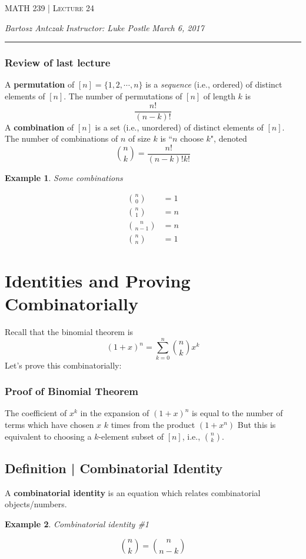 \documentclass{report}
\newcommand{\lectureNum}{24}
\newcommand{\curDate}{March 6, 2017}
\newcommand{\course}{MATH 239}
\newcommand{\instructor}{Luke Postle}
\newtheorem{ex}{Example}[section]
\begin{document}
\begin{center}
\begin{Large}
\textsc{\course{} | Lecture \lectureNum{}}
\end{Large}
\end{center} 
\noindent \textit{Bartosz Antczak} \hfill
\textit{Instructor: \instructor{}} \hfill
\textit{\curDate{}}
\rule{\textwidth}{0.4pt}
\subsubsection{Review of last lecture}
A \textbf{permutation} of $[n] = \{1,2,\cdots, n\}$ is a \textit{sequence} (i.e., ordered) of distinct elements of $[n]$. The number of permutations of $[n]$ of length $k$ is $$\frac{n!}{(n-k)!}$$
A \textbf{combination} of $[n]$ is a set (i.e., unordered) of distinct elements of $[n]$. The number of combinations of $n$ of size $k$ is ``$n$ choose $k$", denoted $${n \choose k} = \frac{n!}{(n-k)!k!}$$
\begin{ex}
Some combinations
\end{ex}
\begin{align*}
n \choose 0 &= 1 \\
n \choose 1 &= n \\
n \choose n-1 &= n \\
n \choose n &= 1
\end{align*}
\section{Identities and Proving Combinatorially}
Recall that the binomial theorem is
$$(1 + x)^n = \sum_{k=0}^n {n \choose k}x^k$$
Let's prove this combinatorially:
\subsubsection{Proof of Binomial Theorem}
The coefficient of $x^k$ in the expansion of $(1+x)^n$ is equal to the number of terms which have chosen $x$ $k$ times from the product $(1 + x^n)$ But this is equivalent to choosing a $k$-element subset of $[n]$, i.e., $n \choose k$.
\subsection{Definition | Combinatorial Identity}
A \textbf{combinatorial identity} is an equation which relates combinatorial objects/numbers.
\begin{ex}
Combinatorial identity \#1
\end{ex}
$${n \choose k} = {n \choose n-k}$$
\end{document}

